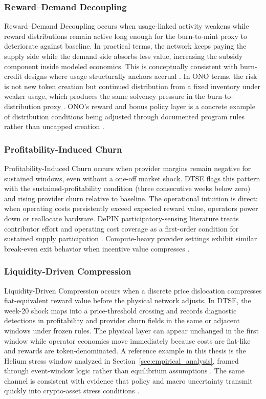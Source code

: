 \subsubsection{Reward--Demand Decoupling}
Reward--Demand Decoupling occurs when usage-linked activity weakens while reward distributions remain active long enough for the burn-to-mint proxy to deteriorate against baseline. In practical terms, the network keeps paying the supply side while the demand side absorbs less value, increasing the subsidy component inside modeled economics. This is conceptually consistent with burn-credit designs where usage structurally anchors accrual \cite{RenderBME, FrontiersDePIN2025}. In ONO terms, the risk is not new token creation but continued distribution from a fixed inventory under weaker usage, which produces the same solvency pressure in the burn-to-distribution proxy \cite{OnocoyToken, OnocoyRewards}. ONO's reward and bonus policy layer is a concrete example of distribution conditions being adjusted through documented program rules rather than uncapped creation \cite{OnocoyRewards, OnocoyBonus}.

\subsubsection{Profitability-Induced Churn}
Profitability-Induced Churn occurs when provider margins remain negative for sustained windows, even without a one-off market shock. DTSE flags this pattern with the sustained-profitability condition (three consecutive weeks below zero) and rising provider churn relative to baseline. The operational intuition is direct: when operating costs persistently exceed expected reward value, operators power down or reallocate hardware. DePIN participatory-sensing literature treats contributor effort and operating cost coverage as a first-order condition for sustained supply participation \cite{Chiu2024, FrontiersDePIN2025}. Compute-heavy provider settings exhibit similar break-even exit behavior when incentive value compresses \cite{Lin2024}.

\subsubsection{Liquidity-Driven Compression}
Liquidity-Driven Compression occurs when a discrete price dislocation compresses fiat-equivalent reward value before the physical network adjusts. In DTSE, the week-20 shock maps into a price-threshold crossing and records diagnostic detections in profitability and provider churn fields in the same or adjacent windows under frozen rules. The physical layer can appear unchanged in the first window while operator economics move immediately because costs are fiat-like and rewards are token-denominated. A reference example in this thesis is the Helium stress window analyzed in Section~\ref{sec:empirical_analysis}, framed through event-window logic rather than equilibrium assumptions \cite{MacKinlay1997}. The same channel is consistent with evidence that policy and macro uncertainty transmit quickly into crypto-asset stress conditions \cite{Ho2022}.

